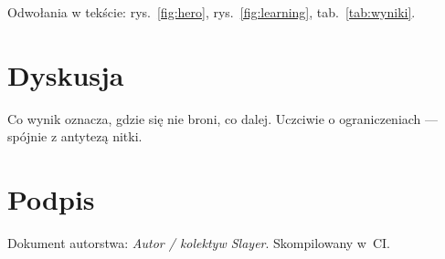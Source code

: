 Odwołania w tekście: rys.~\ref{fig:hero}, rys.~\ref{fig:learning}, tab.~\ref{tab:wyniki}.

\section{Dyskusja}
Co wynik oznacza, gdzie się nie broni, co dalej. Uczciwie o ograniczeniach
--- spójnie z antytezą nitki.

\section*{Podpis}
Dokument autorstwa: \emph{Autor / kolektyw Slayer}. Skompilowany w~CI.
